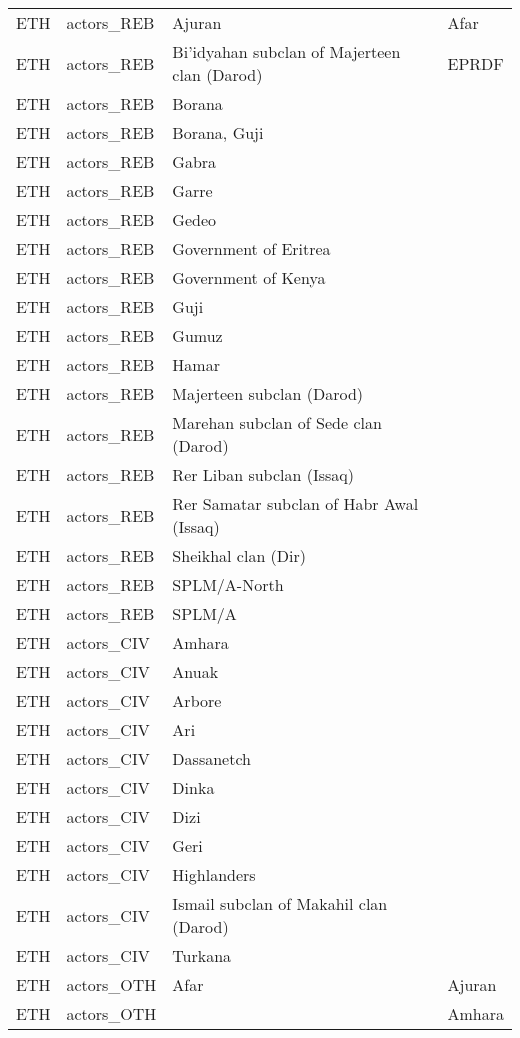 \begin{table}[ht]
\begin{tabular}{llll}
  ETH & actors\_REB & Ajuran & Afar \\ 
  ETH & actors\_REB & Bi'idyahan subclan of Majerteen clan (Darod) & EPRDF \\ 
  ETH & actors\_REB & Borana &  \\ 
  ETH & actors\_REB & Borana, Guji &  \\ 
  ETH & actors\_REB & Gabra &  \\ 
  ETH & actors\_REB & Garre &  \\ 
  ETH & actors\_REB & Gedeo &  \\ 
  ETH & actors\_REB & Government of Eritrea &  \\ 
  ETH & actors\_REB & Government of Kenya &  \\ 
  ETH & actors\_REB & Guji &  \\ 
  ETH & actors\_REB & Gumuz &  \\ 
  ETH & actors\_REB & Hamar &  \\ 
  ETH & actors\_REB & Majerteen subclan (Darod) &  \\ 
  ETH & actors\_REB & Marehan subclan of Sede clan (Darod) &  \\ 
  ETH & actors\_REB & Rer Liban subclan (Issaq) &  \\ 
  ETH & actors\_REB & Rer Samatar subclan of Habr Awal (Issaq) &  \\ 
  ETH & actors\_REB & Sheikhal clan (Dir) &  \\ 
  ETH & actors\_REB & SPLM/A-North &  \\ 
  ETH & actors\_REB & SPLM/A &  \\ 
  ETH & actors\_CIV & Amhara &  \\ 
  ETH & actors\_CIV & Anuak &  \\ 
  ETH & actors\_CIV & Arbore &  \\ 
  ETH & actors\_CIV & Ari &  \\ 
  ETH & actors\_CIV & Dassanetch &  \\ 
  ETH & actors\_CIV & Dinka &  \\ 
  ETH & actors\_CIV & Dizi &  \\ 
  ETH & actors\_CIV & Geri &  \\ 
  ETH & actors\_CIV & Highlanders &  \\ 
  ETH & actors\_CIV & Ismail subclan of Makahil clan (Darod) &  \\ 
  ETH & actors\_CIV & Turkana &  \\ 
  ETH & actors\_OTH & Afar & Ajuran \\ 
  ETH & actors\_OTH &  & Amhara \\ 

\end{tabular}
\end{table}

